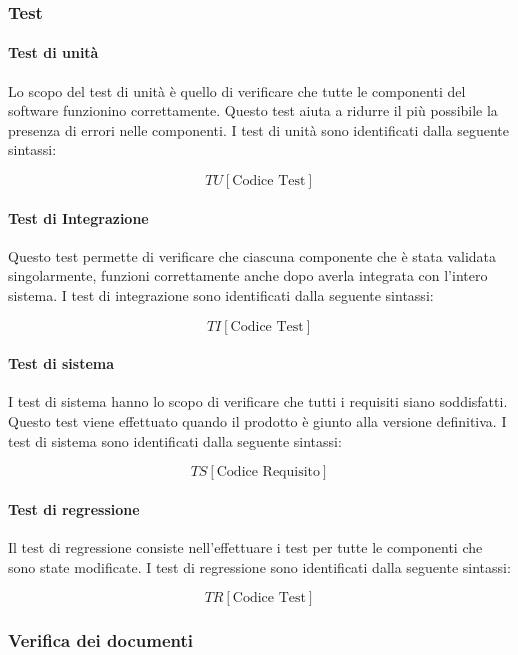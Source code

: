 \subsubsection{Test}

\paragraph{Test di unità}

Lo scopo del test di unità è quello di verificare che tutte le componenti
del software funzionino correttamente. Questo test aiuta a ridurre il
più possibile la presenza di errori nelle componenti. 
I test di unità sono identificati dalla seguente sintassi:

$$ TU[\text{Codice Test}] $$

\paragraph{Test di Integrazione }

Questo test permette di verificare che ciascuna componente che è stata
validata singolarmente, funzioni correttamente anche dopo averla
integrata con l’intero sistema. I test di integrazione sono
identificati dalla seguente sintassi: 

$$ TI[\text{Codice Test}] $$

\paragraph{Test di sistema }

I test di sistema hanno lo scopo di verificare che tutti i requisiti
siano soddisfatti. Questo test viene effettuato quando il prodotto è
giunto alla versione definitiva. I test di sistema sono identificati
dalla seguente sintassi: 

$$ TS[\text{Codice Requisito}] $$

\paragraph{Test di regressione }

Il test di regressione consiste nell’effettuare i test per tutte le
componenti che sono state modificate. I test di regressione sono
identificati dalla seguente sintassi: 

$$ TR[\text{Codice Test}] $$ 

\subsubsection{Verifica dei documenti}

